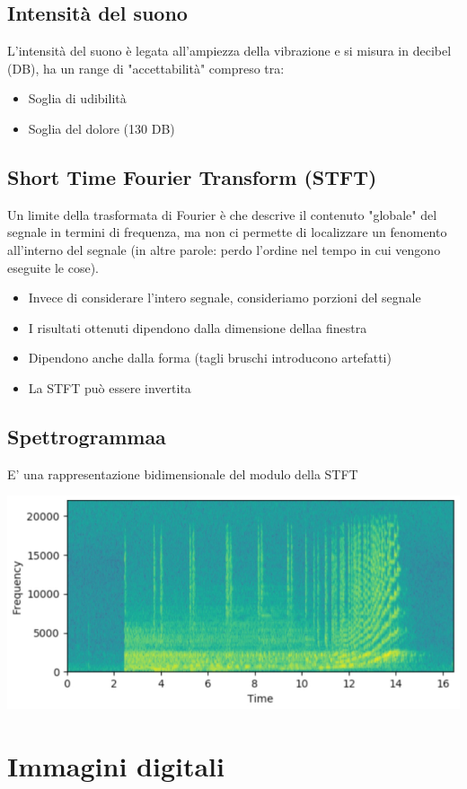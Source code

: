 \documentclass[12pt, a4paper]{report}
\begin{document}
\section{Intensità del suono}
L'intensità del suono è legata all'ampiezza della vibrazione e si misura in decibel (DB), ha un range di "accettabilità" compreso tra:
\begin{itemize}
    \item Soglia di udibilità
    \item Soglia del dolore (130 DB)
\end{itemize}
\section{Short Time Fourier Transform (STFT)}
Un limite della trasformata di Fourier è che descrive il contenuto "globale" del segnale in termini di frequenza, ma non ci permette di localizzare un fenomento all'interno del segnale (in altre parole: perdo l'ordine nel tempo in cui vengono eseguite le cose).
\begin{itemize}
    \item Invece di considerare l'intero segnale, consideriamo porzioni del segnale
    \item I risultati ottenuti dipendono dalla dimensione dellaa finestra
    \item Dipendono anche dalla forma (tagli bruschi introducono artefatti)
    \item La STFT può essere invertita
\end{itemize}
\section{Spettrogrammaa}
E' una rappresentazione bidimensionale del modulo della STFT
\begin{center}
    \includegraphics[width=.8\textwidth]{Immagini/spettrogramma.png}
\end{center}
\chapter{Immagini digitali}
\end{document}
